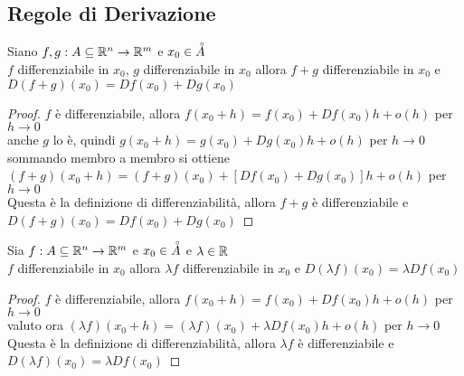 \subsection{Regole di Derivazione}
\proposition
Siano $f,g: A\subseteq \mathbb{R}^n \rightarrow \mathbb{R}^m$ e $x_0\in\accentset{\circ}{A}$\\
$f$ differenziabile in $x_0$, $g$ differenziabile in $x_0$ allora $f+g$ differenziabile in $x_0$ e $D(f+g)(x_0) = Df(x_0)+Dg(x_0)$
\begin{proof}
	$f$ è differenziabile, allora $f(x_0+h)=f(x_0)+Df(x_0)h+o(h)$ per $h\rightarrow 0$\\
	anche $g$ lo è, quindi $g(x_0+h)=g(x_0)+Dg(x_0)h+o(h)$ per $h\rightarrow 0$\\
	sommando membro a membro si ottiene  $(f+g)(x_0+h)=(f+g)(x_0)+[Df(x_0)+Dg(x_0)]h+o(h)$ per $h\rightarrow 0$\\
	Questa è la definizione di differenziabilità, allora $f+g$ è differenziabile e $D(f+g)(x_0) = Df(x_0)+Dg(x_0)$
\end{proof}

\proposition
Sia $f: A\subseteq \mathbb{R}^n \rightarrow \mathbb{R}^m$ e $x_0\in\accentset{\circ}{A}$ e $\lambda\in \mathbb{R}$\\
$f$ differenziabile in $x_0$ allora $\lambda f$ differenziabile in $x_0$ e $D(\lambda f)(x_0) = \lambda Df(x_0)$
\begin{proof}
	$f$ è differenziabile, allora $f(x_0+h)=f(x_0)+Df(x_0)h+o(h)$ per $h\rightarrow 0$\\
	valuto ora $(\lambda f)(x_0+h)=(\lambda f)(x_0)+\lambda Df(x_0)h+o(h)$ per $h\rightarrow 0$\\
	Questa è la definizione di differenziabilità, allora $\lambda f$ è differenziabile e $D(\lambda f)(x_0) = \lambda Df(x_0)$
\end{proof}

